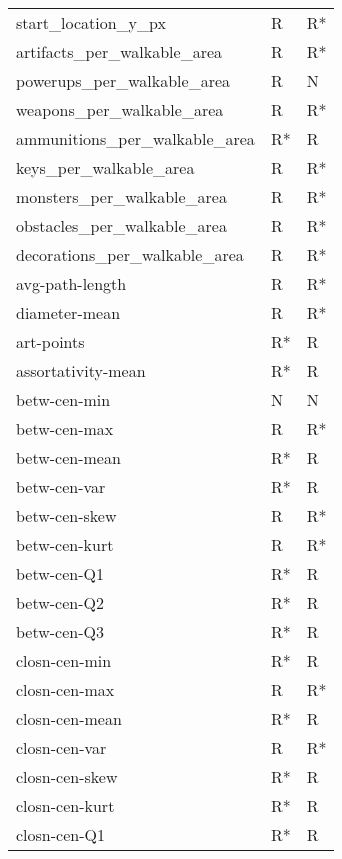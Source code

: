 \begin{longtable}{lll}
	start\_location\_y\_px           &      R &   R* \\
	artifacts\_per\_walkable\_area   &      R &   R* \\
	powerups\_per\_walkable\_area    &      R &    N \\
	weapons\_per\_walkable\_area     &      R &   R* \\
	ammunitions\_per\_walkable\_area &     R* &    R \\
	keys\_per\_walkable\_area        &      R &   R* \\
	monsters\_per\_walkable\_area    &      R &   R* \\
	obstacles\_per\_walkable\_area   &      R &   R* \\
	decorations\_per\_walkable\_area &      R &   R* \\
	avg-path-length               &      R &   R* \\
	diameter-mean                 &      R &   R* \\
	art-points                    &     R* &    R \\
	assortativity-mean            &     R* &    R \\
	betw-cen-min                  &      N &    N \\
	betw-cen-max                  &      R &   R* \\
	betw-cen-mean                 &     R* &    R \\
	betw-cen-var                  &     R* &    R \\
	betw-cen-skew                 &      R &   R* \\
	betw-cen-kurt                 &      R &   R* \\
	betw-cen-Q1                   &     R* &    R \\
	betw-cen-Q2                   &     R* &    R \\
	betw-cen-Q3                   &     R* &    R \\
	closn-cen-min                 &     R* &    R \\
	closn-cen-max                 &      R &   R* \\
	closn-cen-mean                &     R* &    R \\
	closn-cen-var                 &      R &   R* \\
	closn-cen-skew                &     R* &    R \\
	closn-cen-kurt                &     R* &    R \\
	closn-cen-Q1                  &     R* &    R \\

\end{longtable}
